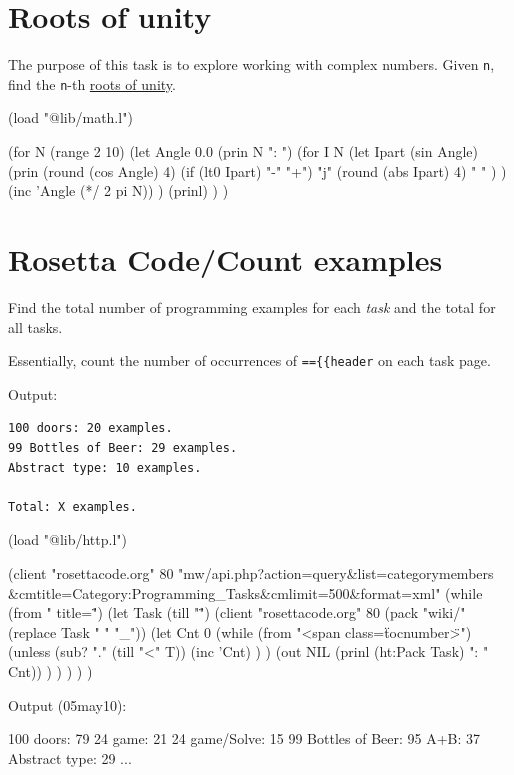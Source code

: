 \pagebreak{}
\section*{Roots of unity}

The purpose of this task is to explore working with complex numbers.
Given \texttt{n}, find the \texttt{n}-th
\href{http://en.wikipedia.org/wiki/Roots\_of\_unity}{roots of unity}.

\begin{wideverbatim}

(load "@lib/math.l")

(for N (range 2 10)
   (let Angle 0.0
      (prin N ": ")
      (for I N
         (let Ipart (sin Angle)
            (prin
               (round (cos Angle) 4)
               (if (lt0 Ipart) "-" "+")
               "j"
               (round (abs Ipart) 4)
               "  " ) )
         (inc 'Angle (*/ 2 pi N)) )
      (prinl) ) )

\end{wideverbatim}

\pagebreak{}
\section*{Rosetta Code/Count examples}


Find the total number of programming examples for each
\emph{task} and the total for all
tasks.

Essentially, count the number of occurrences of
\texttt{==\{\{header\textbar{}} on each task page.

Output:

\begin{verbatim}
100 doors: 20 examples.
99 Bottles of Beer: 29 examples.
Abstract type: 10 examples.

Total: X examples.
\end{verbatim}

\begin{wideverbatim}

(load "@lib/http.l")

(client "rosettacode.org" 80
"mw/api.php?action=query\&list=categorymembers
\&cmtitle=Category:Programming_Tasks\&cmlimit=500\&format=xml"
   (while (from " title=\"")
      (let Task (till "\"")
         (client "rosettacode.org" 80 (pack "wiki/" (replace Task " " "_"))
            (let Cnt 0
               (while (from "<span class=\"tocnumber\">")
                  (unless (sub? "." (till "<" T))
                     (inc 'Cnt) ) )
               (out NIL (prinl (ht:Pack Task) ": " Cnt)) ) ) ) ) )

Output (05may10):

100 doors: 79
24 game: 21
24 game/Solve: 15
99 Bottles of Beer: 95
A+B: 37
Abstract type: 29
...

\end{wideverbatim}

